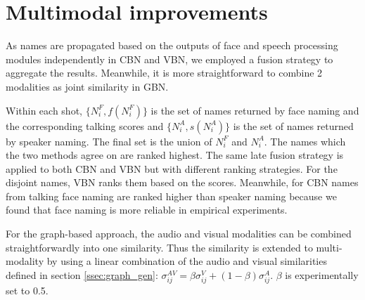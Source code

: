 \section{Multimodal improvements}
\label{sec:multimodal}

As names are propagated based on the outputs of face and speech processing modules independently in CBN and VBN, we employed a fusion strategy to aggregate the results. Meanwhile, it is more straightforward to combine 2 modalities as joint similarity in GBN.

 Within each shot, $\{N^F_i, f(N^F_i)\}$ is the set of names returned by face naming and the corresponding talking scores and $\{N^A_i,  s(N^A_i)\}$  is the set of names returned by speaker naming.
%
The final set is the union of ${N^F_i}$ and ${N^A_i}$. The names which the two methods agree on are ranked highest.
%
The same late fusion strategy is applied to both CBN and VBN but with different ranking strategies.
%
For the disjoint names, VBN ranks them based on the scores. Meanwhile, for CBN
%
names from talking face naming are ranked higher than speaker naming  because we found that face naming is more reliable in empirical experiments.
%
%

 For the graph-based approach, the audio and visual modalities can be combined straightforwardly into one similarity.
%
Thus the similarity is extended to multi-modality by using a linear combination of the audio and visual similarities defined in section \ref{ssec:graph_gen}: $\sigma^{AV}_{ij} = \beta \sigma^V_{ij} + (1-\beta) \sigma^A_{ij}$. $\beta$ is experimentally set to 0.5.

\endinput

\begin{algorithm}
  \caption{Ranking names within shots
    \label{algo:ranking}}
  \begin{algorithmic}[1]
	  \For{$s_k \in S$}
 	  	    \State{$Q_{s_k} = \emptyset$}
		    \State{Face\_naming$(s_k) \Rightarrow (N^F_i, t(N^F_i))$}
				\State{Speaker\_naming$(s_k) \Rightarrow (N^A_j, 1.0)$}
				\For{each $N^F_i$}
					\If{$\exists N^A_j / N^A_j = N^F_i$}
						\State{$Q_{s_k} = Q_{s_k} \cup \{(N^F_i, t(N^F_i) + 2.0)\}$}
					\Else
						\State{$Q_{s_k} = Q_{s_k} \cup \{(N^F_i, t(N^F_i) + 1.0)\}$}
					\EndIf
				\EndFor
				\For{each $N^A_j$}
					\If{not $\exists N^F_i / N^F_i = N^A_j$}
						\State{$Q_{s_k} = Q_{s_k} \cup \{(N^A_j, 1.0)\}$}
					\EndIf
				\EndFor
		\EndFor
  \end{algorithmic}
\end{algorithm}
%